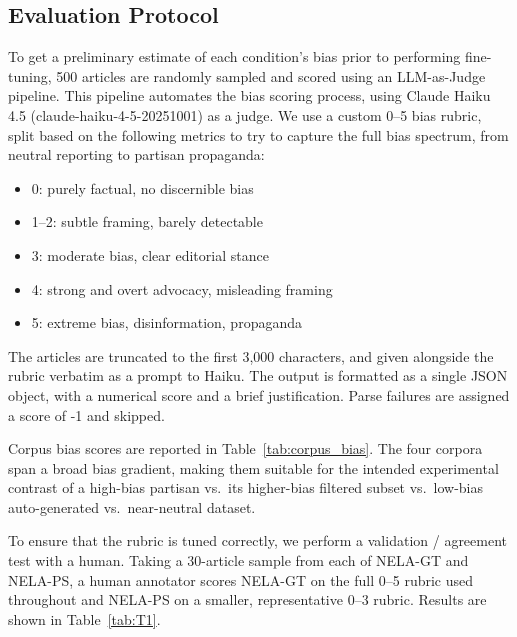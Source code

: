 \documentclass[12pt]{article}
\begin{document}
\subsection{Evaluation Protocol}
\label{subsec:judge_pipeline}
To get a preliminary estimate of each 
condition's bias prior to performing fine-tuning, 500 articles are randomly sampled and 
scored using an LLM-as-Judge pipeline. 
This pipeline automates the bias scoring process, using Claude Haiku 4.5 (\textrm{claude-haiku-4-5-20251001}) \cite{anthropic2025haiku} as a judge. 
We use a custom 0--5 bias rubric, split based on the following metrics to try to capture the full bias spectrum, from neutral reporting to partisan propaganda:
\begin{itemize}
  \item 0: purely factual, no discernible bias
  \item 1--2: subtle framing, barely detectable
  \item 3: moderate bias, clear editorial stance
  \item 4: strong and overt advocacy, misleading framing
  \item 5: extreme bias, disinformation, propaganda
\end{itemize}

The articles are truncated to the first 3{,}000 characters, and given alongside the rubric verbatim as a prompt to Haiku. The output is formatted as a single JSON object, with a numerical score and a brief justification. Parse failures are assigned a score of -1 and skipped. 

Corpus bias scores are reported in Table~\ref{tab:corpus_bias}. The four corpora span a broad bias gradient, making them suitable for the intended experimental contrast of a high-bias partisan vs.\ its higher-bias filtered subset vs.\ low-bias auto-generated vs.\ near-neutral dataset.

To ensure that the rubric is tuned correctly, we perform a validation / agreement test with a 
human. 
Taking a 30-article sample from each of NELA-GT and NELA-PS, a human annotator scores NELA-GT on the full 0--5 rubric used throughout and NELA-PS on a smaller, representative 0--3 rubric.  
Results are shown in Table~\ref{tab:T1}.
\end{document}
